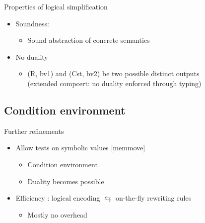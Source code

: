 \begin{frame}{Properties of logical simplification}
      \begin{itemize}
      \item Soundness: 
      \begin{itemize}
      \item Sound abstraction of concrete semantics~
      \end{itemize}
      \bigskip
      \item No duality
      \begin{itemize}
      \item {\scriptsize (R, bv1) and (Cst, bv2)} {\color{blue}{cannot}} be two possible distinct outputs\\
      (extended compcert: no duality enforced through typing)
      \end{itemize}
      \end{itemize}
\end{frame}



\subsection{Condition environment}


\begin{frame}{Further refinements}
      \begin{itemize}
      \item Allow tests on symbolic values [memmove]
      \begin{itemize}
      \item Condition environment
      \item Duality becomes possible
      \end{itemize}
      \bigskip
      \item Efficiency : logical encoding $\leftrightarrows$ on-the-fly rewriting rules 
       \begin{itemize}
       \item Mostly no overhead
       \end{itemize}
      \end{itemize}
\end{frame}


